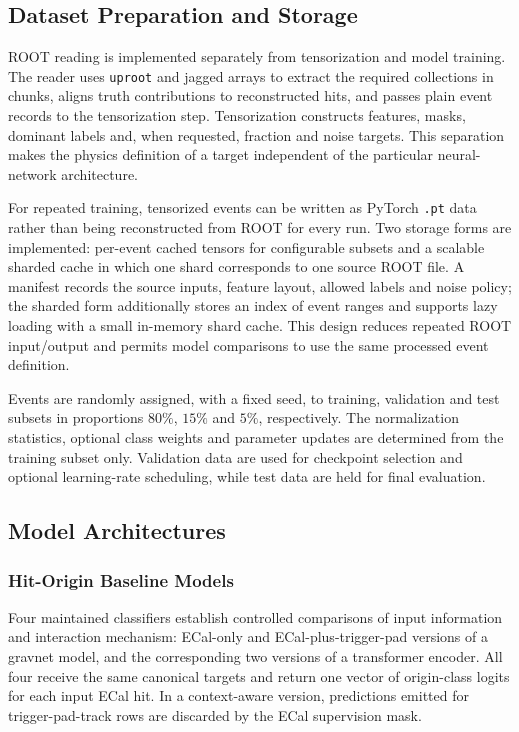 \subsection{Dataset Preparation and Storage}
\label{sec:method_processing}

ROOT reading is implemented separately from tensorization and model training.
The reader uses \texttt{uproot} and jagged arrays to extract the required
collections in chunks, aligns truth contributions to reconstructed hits, and
passes plain event records to the tensorization step. Tensorization constructs
features, masks, dominant labels and, when requested, fraction and noise
targets. This separation makes the physics definition of a target independent
of the particular neural-network architecture.

For repeated training, tensorized events can be written as PyTorch
\texttt{.pt} data rather than being reconstructed from ROOT for every run.
Two storage forms are implemented: per-event cached tensors for configurable
subsets and a scalable sharded cache in which one shard corresponds to one
source ROOT file. A manifest records the source inputs, feature layout,
allowed labels and noise policy; the sharded form additionally stores an
index of event ranges and supports lazy loading with a small in-memory shard
cache. This design reduces repeated ROOT input/output and permits model
comparisons to use the same processed event definition.

Events are randomly assigned, with a fixed seed, to training, validation and
test subsets in proportions \(80\%\), \(15\%\) and \(5\%\), respectively.
The normalization statistics, optional class weights and parameter updates
are determined from the training subset only. Validation data are used for
checkpoint selection and optional learning-rate scheduling, while test data
are held for final evaluation.

\subsection{Model Architectures}
\label{sec:method_models}

\subsubsection{Hit-Origin Baseline Models}

Four maintained classifiers establish controlled comparisons of input
information and interaction mechanism: ECal-only and ECal-plus-trigger-pad
versions of a \gls{gravnet} model, and the corresponding two versions of a
transformer encoder. All four receive the same canonical targets and return
one vector of origin-class logits for each input ECal hit. In a
context-aware version, predictions emitted for trigger-pad-track rows are
discarded by the ECal supervision mask.

